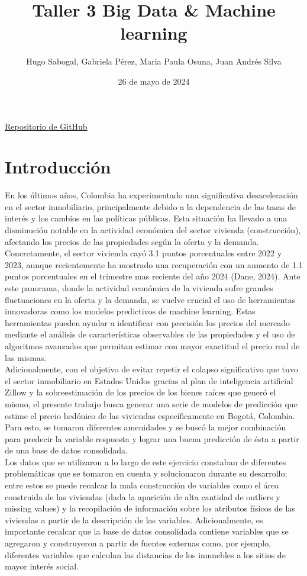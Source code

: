 \documentclass[10pt]{article}
\title{\textbf{Taller 3 Big Data \& Machine learning}}
\author{Hugo Sabogal, Gabriela Pérez, Maria Paula Osuna, Juan Andrés Silva}
\affil{Universidad de los Andes \\ Facultad de Economía}
\date{26 de mayo de 2024}
\begin{document}
\maketitle

\begin{center}
    \href{https://github.com/Hugo-Andres-Sabogal-Perez/Problem-set-3}{\label{repo}Repositorio de GitHub}
\end{center}

\section{Introducción}
En los últimos años, Colombia ha experimentado una significativa desaceleración en el sector inmobiliario, principalmente debido a la dependencia de las tasas de interés y los cambios en las políticas públicas. Esta situación ha llevado a una disminución notable en la actividad económica del sector vivienda (construcción), afectando los precios de las propiedades según la oferta y la demanda. Concretamente, el sector vivienda cayó 3.1 puntos porcentuales entre 2022 y 2023, aunque recientemente ha mostrado una recuperación con un aumento de 1.1 puntos porcentuales en el trimestre mas reciente del año 2024 (Dane, 2024). Ante este panorama, donde la actividad económica de la vivienda sufre grandes fluctuaciones en la oferta y la demanda, se vuelve crucial el uso de herramientas innovadoras como los modelos predictivos de machine learning. Estas herramientas pueden ayudar a identificar con precisión los precios del mercado mediante el análisis de características observables de las propiedades y el uso de algoritmos avanzados que permitan estimar con mayor exactitud el precio real de las mismas. \\

Adicionalmente, con el objetivo de evitar repetir el colapso significativo que tuvo el sector inmobiliario en Estados Unidos gracias al plan de inteligencia artificial Zillow y la sobreestimación de los precios de los bienes raíces que generó el mismo, el presente trabajo busca generar una serie de modelos de predicción que estime el precio hedónico de las viviendas específicamente en Bogotá, Colombia. Para esto, se tomaron diferentes amenidades y se buscó la mejor combinación para predecir la variable respuesta y lograr una buena predicción de ésta a partir de una base de datos consolidada. \\

Los datos que se utilizaron a lo largo de este ejercicio constaban de diferentes problemáticas que se tomaron en cuenta y solucionaron durante su desarrollo; entre estos se puede recalcar la mala construcción de variables como el área construida de las viviendas (dada la aparición de alta cantidad de outliers y missing values) y la recopilación de información sobre los atributos físicos de las viviendas a partir de la descripción de las variables. Adicionalmente, es importante recalcar que la base de datos consolidada contiene variables que se agregaron y construyeron a partir de fuentes externas como, por ejemplo, diferentes variables que calculan las distancias de los inmuebles a los sitios de mayor interés social.  \\
\end{document}
